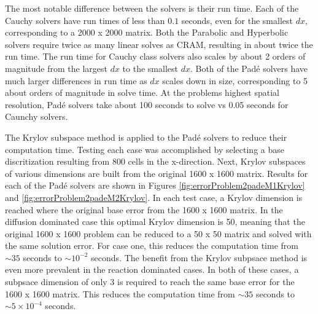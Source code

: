 The most notable difference between the solvers is their run time. Each of the Cauchy solvers have run times of less than $0.1$ seconds, even for the smallest $dx$, corresponding to a 2000 x 2000 matrix. Both the Parabolic and Hyperbolic solvers require twice as many linear solves as CRAM, resulting in about twice the run time. The run time for Cauchy class solvers also scales by about 2 orders of magnitude from the largest $dx$ to the smallest $dx$. Both of the Pad\'e solvers have much larger differences in run time as $dx$ scales down in size, corresponding to 5 about orders of magnitude in solve time. At the problems highest spatial resolution, Pad\'e solvers take about 100 seconds to solve vs 0.05 seconds for Caunchy solvers. 

The Krylov subspace method is applied to the Pad\'e solvers to reduce their computation time. Testing each case was accomplished by selecting a base discritization resulting from 800 cells in the x-direction. Next, Krylov subspaces of various dimensions are built from the original 1600 x 1600 matrix. Results for each of the Pad\'e solvers are shown in Figures \ref{fig:errorProblem2padeM1Krylov} and \ref{fig:errorProblem2padeM2Krylov}. In each test case, a Krylov dimension is reached where the original base error from the 1600 x 1600 matrix. In the diffusion dominated case this optimal Krylov dimension is 50, meaning that the original 1600 x 1600 problem can be reduced to a 50 x 50 matrix and solved with the same solution error. For case one, this reduces the computation time from $\sim35$ seconds to $\sim 10^{-2}$ seconds. The benefit from the Krylov subpsace method is even more prevalent in the reaction dominated cases. In both of these cases, a subpsace dimension of only 3 is required to reach the same base error for the 1600 x 1600 matrix. This reduces the computation time from $\sim 35$ seconds to $\sim 5\times 10^{-4}$ seconds. 

